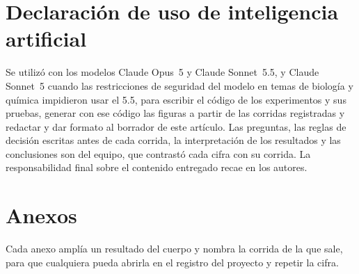 \documentclass[letterpaper,11pt]{article}
\begin{document}
\section*{Declaración de uso de inteligencia artificial}
Se utilizó \textcite{anthropic2026claude} con los modelos Claude Opus~5 y Claude Sonnet~5.5, y Claude Sonnet~5 cuando las restricciones de seguridad del modelo en temas de biología y química impidieron usar el 5.5, para escribir el código de los experimentos y sus pruebas, generar con ese código las figuras a partir de las corridas registradas y redactar y dar formato al borrador de este artículo. Las preguntas, las reglas de decisión escritas antes de cada corrida, la interpretación de los resultados y las conclusiones son del equipo, que contrastó cada cifra con su corrida. La responsabilidad final sobre el contenido entregado recae en los autores.

\printbibliography[title={Referencias}]

\clearpage
\appendix
\section*{Anexos}
Cada anexo amplía un resultado del cuerpo y nombra la corrida de la que sale, para que cualquiera pueda abrirla en el registro del proyecto y repetir la cifra.
\end{document}
